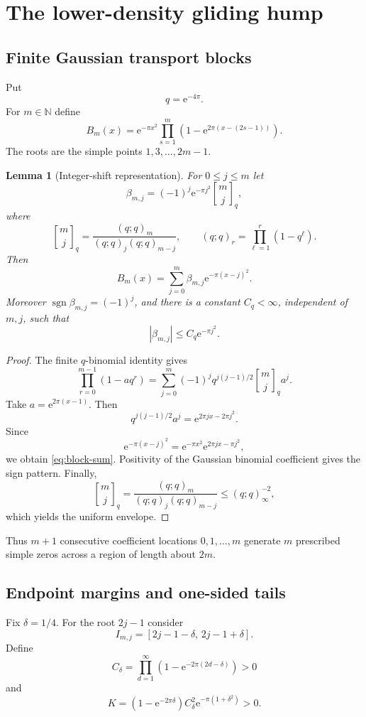 \documentclass[11pt]{article}
\newtheorem{lemma}[theorem]{Lemma}
\newcommand{\N}{\mathbb{N}}
\newcommand{\e}{\mathrm{e}}
\newcommand{\qbinom}[2]{\genfrac{[}{]}{0pt}{}{#1}{#2}_{q}}
\newcommand{\sgn}{\operatorname{sgn}}
\begin{document}
\section{The lower-density gliding hump}

\subsection{Finite Gaussian transport blocks}
Put
\[
 q=\e^{-4\pi}.
\]
For $m\in\N$ define
\begin{equation}\label{eq:block-product}
 B_m(x)=\e^{-\pi x^2}\prod_{s=1}^{m}
 \left(1-\e^{2\pi(x-(2s-1))}\right).
\end{equation}
The roots are the simple points $1,3,\ldots,2m-1$.

\begin{lemma}[Integer-shift representation]\label{lem:qbinom-lower}
For $0\le j\le m$ let
\[
 \beta_{m,j}=(-1)^j\e^{-\pi j^2}\qbinom{m}{j},
\]
where
\[
 \qbinom{m}{j}=
 \frac{(q;q)_m}{(q;q)_j(q;q)_{m-j}},\qquad
 (q;q)_r=\prod_{\ell=1}^{r}(1-q^\ell).
\]
Then
\begin{equation}\label{eq:block-sum}
 B_m(x)=\sum_{j=0}^{m}\beta_{m,j}\e^{-\pi(x-j)^2}.
\end{equation}
Moreover $\sgn\beta_{m,j}=(-1)^j$, and there is a constant $C_q<\infty$, independent of $m,j$, such that
\[
 |\beta_{m,j}|\le C_q\e^{-\pi j^2}.
\]
\end{lemma}

\begin{proof}
The finite $q$-binomial identity gives
\[
 \prod_{r=0}^{m-1}(1-aq^r)
 =\sum_{j=0}^{m}(-1)^jq^{j(j-1)/2}\qbinom{m}{j}a^j.
\]
Take $a=\e^{2\pi(x-1)}$. Then
\[
 q^{j(j-1)/2}a^j=\e^{2\pi jx-2\pi j^2}.
\]
Since
\[
 \e^{-\pi(x-j)^2}=\e^{-\pi x^2}\e^{2\pi jx-\pi j^2},
\]
we obtain \eqref{eq:block-sum}. Positivity of the Gaussian binomial coefficient gives the sign pattern. Finally,
\[
 \qbinom{m}{j}
 =\frac{(q;q)_m}{(q;q)_j(q;q)_{m-j}}
 \le (q;q)_\infty^{-2},
\]
which yields the uniform envelope.
\end{proof}

Thus $m+1$ consecutive coefficient locations $0,1,\ldots,m$ generate $m$ prescribed simple zeros across a region of length about $2m$.

\subsection{Endpoint margins and one-sided tails}
Fix $\delta=1/4$. For the root $2j-1$ consider
\[
 I_{m,j}=[2j-1-\delta,\,2j-1+\delta].
\]
Define
\[
 C_\delta=\prod_{d=1}^{\infty}
 \left(1-\e^{-2\pi(2d-\delta)}\right)>0
\]
and
\begin{equation}\label{eq:K}
 K=(1-\e^{-2\pi\delta})C_\delta^2\e^{-\pi(1+\delta^2)}>0.
\end{equation}
\end{document}
